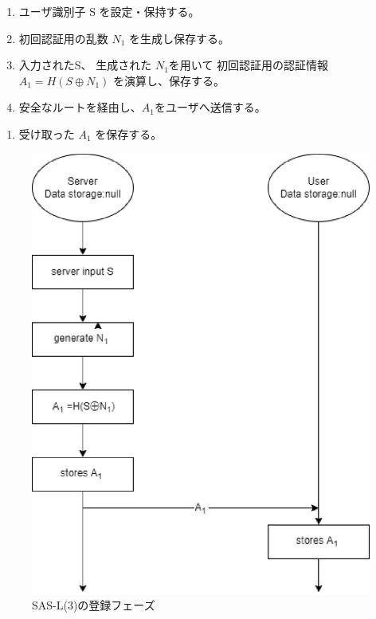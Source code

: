 \documentclass{thesis}
\begin{document}
\begin{enumerate}[1.]
\item ユーザ識別子 S を設定・保持する。
				\item 初回認証用の乱数 $N_1$ を生成し保存する。
				\item 入力されたS、 生成された $N_1$を用いて 初回認証用の認証情報$A_1 = H(S \oplus N_1)$ を演算し、保存する。
				\item 安全なルートを経由し、$A_1$をユーザへ送信する。
\end{enumerate}

\begin{enumerate}[1.]
\item 受け取った $A_1$ を保存する。
\end{enumerate}
%
\begin{figure}[H]
 \center
 \includegraphics[scale=0.75]{./image/sasl3first.eps}
 \caption{SAS-L(3)の登録フェーズ}
 \label{3f}
\end{figure}
%
\end{document}
